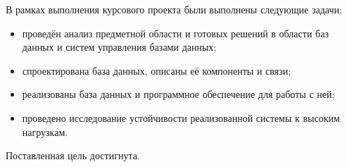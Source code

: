 
В рамках выполнения курсового проекта были выполнены следующие задачи:

\begin{itemize}
	\item проведён анализ предметной области и готовых решений в области баз данных и систем управления базами данных;
	\item спроектирована база данных, описаны её компоненты и связи;
	\item реализованы база данных и программное обеспечение для работы с ней;
	\item проведено исследование устойчивости реализованной системы к высоким нагрузкам.
\end{itemize}

Поставленная цель достигнута.